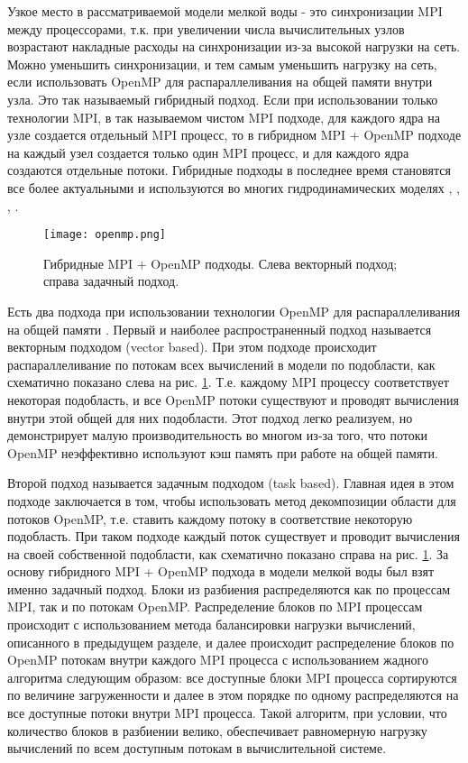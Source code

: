 Узкое место в рассматриваемой модели мелкой воды - это синхронизации MPI между процессорами, т.к.  при увеличении числа вычислительных узлов возрастают накладные расходы на синхронизации из-за высокой нагрузки на сеть. Можно уменьшить синхронизации, и тем самым уменьшить нагрузку на сеть, если использовать OpenMP для распараллеливания на общей памяти внутри узла. Это так называемый гибридный подход. Если при использовании только технологии MPI, в так называемом чистом MPI подходе, для каждого ядра на узле создается отдельный MPI процесс, то в гибридном MPI + OpenMP подходе на каждый узел создается только один MPI процесс, и для каждого ядра создаются отдельные потоки. Гибридные подходы в последнее время становятся все более актуальными и используются во многих гидродинамических моделях \cite{Liu2019ParallelIA}, \cite{Afzal_Ansari_Faizabadi_Ramis_2016}, \cite{MPIOpenMP2017},  \cite{Mortikov2016}.

	\begin{figure}[htb!]
    \center
    \texttt{[image: openmp.png]}
    \caption{Гибридные MPI + OpenMP подходы. Слева векторный подход; справа задачный подход.}
    \label{fig:openmp}
    \end{figure}

Есть два подхода при использовании технологии OpenMP для распараллеливания на общей памяти \cite{Wellein2003}. Первый и наиболее распространенный подход называется векторным подходом (vector based). При этом подходе происходит распараллеливание по потокам всех вычислений в модели по подобласти, как схематично показано слева на рис. \ref{fig:openmp}. Т.е. каждому MPI процессу соответствует некоторая подобласть, и все OpenMP потоки существуют и проводят вычисления внутри этой общей для них подобласти. Этот подход легко реализуем, но демонстрирует малую производительность во многом из-за того, что потоки OpenMP неэффективно используют кэш память при работе на общей памяти.

Второй подход называется задачным подходом (task based). Главная идея в этом подходе заключается в том, чтобы использовать метод декомпозиции области для потоков OpenMP, т.е. ставить каждому потоку в соответствие некоторую подобласть. При таком подходе каждый поток существует и проводит вычисления на своей собственной подобласти, как схематично показано справа на рис. \ref{fig:openmp}. За основу гибридного MPI + OpenMP подхода в модели мелкой воды был взят именно задачный подход. Блоки из разбиения распределяются как по процессам MPI, так и по потокам OpenMP. Распределение блоков по MPI процессам происходит с использованием метода балансировки нагрузки вычислений, описанного в предыдущем разделе, и далее происходит распределение блоков по OpenMP потокам внутри каждого MPI процесса с использованием жадного алгоритма следующим образом: все доступные блоки MPI процесса сортируются по величине загруженности и далее в этом порядке по одному распределяются на все доступные потоки внутри MPI процесса. Такой алгоритм, при условии, что количество блоков в разбиении велико, обеспечивает равномерную нагрузку вычислений по всем доступным потокам в вычислительной системе.

